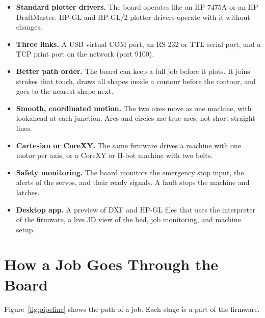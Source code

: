 \begin{itemize}
  \item \textbf{Standard plotter drivers.} The board operates like an HP 7475A
        or an HP DraftMaster. HP-GL and HP-GL/2 plotter drivers operate with
        it without changes.
  \item \textbf{Three links.} A USB virtual COM port, an RS-232 or TTL serial
        port, and a TCP print port on the network (port 9100).
  \item \textbf{Better path order.} The board can keep a full job before it
        plots. It joins strokes that touch, draws all shapes inside a contour
        before the contour, and goes to the nearest shape next.
  \item \textbf{Smooth, coordinated motion.} The two axes move as one machine,
        with lookahead at each junction. Arcs and circles are true arcs, not
        short straight lines.
  \item \textbf{Cartesian or CoreXY.} The same firmware drives a machine with
        one motor per axis, or a CoreXY or H-bot machine with two belts.
  \item \textbf{Safety monitoring.} The board monitors the emergency stop
        input, the alerts of the servos, and their ready signals. A fault
        stops the machine and latches.
  \item \textbf{Desktop app.} A preview of DXF and HP-GL files that uses the
        interpreter of the firmware, a live 3D view of the bed, job
        monitoring, and machine setup.
\end{itemize}

\section{How a Job Goes Through the Board}

Figure~\ref{fig:pipeline} shows the path of a job. Each stage is a part of
the firmware.

